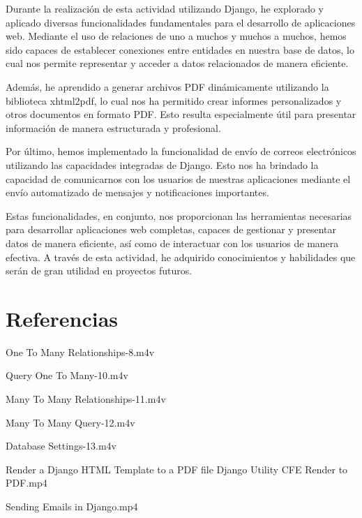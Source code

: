 \documentclass{article}
\begin{document}
Durante la realización de esta actividad utilizando Django, he explorado y aplicado diversas funcionalidades fundamentales para el desarrollo de aplicaciones web. Mediante el uso de relaciones de uno a muchos y muchos a muchos, hemos sido capaces de establecer conexiones entre entidades en nuestra base de datos, lo cual nos permite representar y acceder a datos relacionados de manera eficiente.

Además, he aprendido a generar archivos PDF dinámicamente utilizando la biblioteca xhtml2pdf, lo cual nos ha permitido crear informes personalizados y otros documentos en formato PDF. Esto resulta especialmente útil para presentar información de manera estructurada y profesional.

Por último, hemos implementado la funcionalidad de envío de correos electrónicos utilizando las capacidades integradas de Django. Esto nos ha brindado la capacidad de comunicarnos con los usuarios de nuestras aplicaciones mediante el envío automatizado de mensajes y notificaciones importantes.

Estas funcionalidades, en conjunto, nos proporcionan las herramientas necesarias para desarrollar aplicaciones web completas, capaces de gestionar y presentar datos de manera eficiente, así como de interactuar con los usuarios de manera efectiva. A través de esta actividad, he adquirido conocimientos y habilidades que serán de gran utilidad en proyectos futuros.

\section{Referencias}

\begin{thebibliography}{9}
 One To Many Relationships-8.m4v

 Query One To Many-10.m4v

 Many To Many Relationships-11.m4v

 Many To Many Query-12.m4v

 Database Settings-13.m4v

 Render a Django HTML Template to a PDF file Django Utility CFE Render to PDF.mp4

 Sending Emails in Django.mp4
\end{thebibliography}
\end{document}
